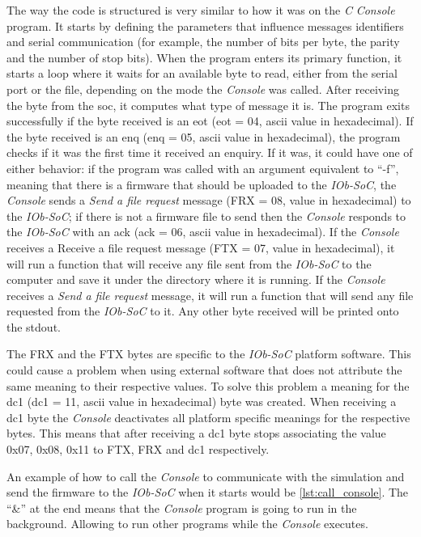 The way the code is structured is very similar to how it was on the \textit{C} \textit{Console} program. It starts by defining the parameters that influence messages identifiers and serial communication (for example, the number of bits per byte, the parity and the number of stop bits). When the program enters its primary function, it starts a loop where it waits for an available byte to read, either from the serial port or the file, depending on the mode the \textit{Console} was called. After receiving the byte from the \acrshort{soc}, it computes what type of message it is. The program exits successfully if the byte received is an \acrlong{eot} (\acrshort{eot} = 04, \acrshort{ascii} value in hexadecimal). If the byte received is an \acrlong{enq} (\acrshort{enq} = 05, \acrshort{ascii} value in hexadecimal), the program checks if it was the first time it received an enquiry. If it was, it could have one of either behavior: if the program was called with an argument equivalent to \enquote{-f}, meaning that there is a firmware that should be uploaded to the \textit{IOb-SoC}, the \textit{Console} sends a \textit{Send a file request} message (FRX = 08, value in hexadecimal) to the \textit{IOb-SoC}; if there is not a firmware file to send then the \textit{Console} responds to the \textit{IOb-SoC} with an \acrlong{ack} (\acrshort{ack} = 06, \acrshort{ascii} value in hexadecimal). If the \textit{Console} receives a Receive a file request message (FTX = 07, value in hexadecimal), it will run a function that will receive any file sent from the \textit{IOb-SoC} to the computer and save it under the directory where it is running. If the \textit{Console} receives a \textit{Send a file request} message, it will run a function that will send any file requested from the \textit{IOb-SoC} to it. Any other byte received will be printed onto the stdout.

The FRX and the FTX bytes are specific to the \textit{IOb-SoC} platform software. This could cause a problem when using external software that does not attribute the same meaning to their respective values. To solve this problem a meaning for the \acrlong{dc1} (\acrshort{dc1} = 11, \acrshort{ascii} value in hexadecimal) byte was created. When receiving a \acrshort{dc1} byte the \textit{Console} deactivates all platform specific meanings for the respective bytes. This means that after receiving a \acrshort{dc1} byte stops associating the value 0x07, 0x08, 0x11 to FTX, FRX and \acrshort{dc1} respectively.

An example of how to call the \textit{Console} to communicate with the simulation and send the firmware to the \textit{IOb-SoC} when it starts would be \ref{lst:call_console}. The \enquote{\&} at the end means that the \textit{Console} program is going to run in the background. Allowing to run other programs while the \textit{Console} executes.


